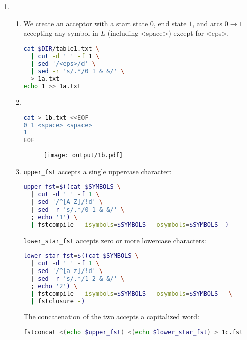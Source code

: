 \documentclass[a4paper,oneside,reqno]{amsart}
\begin{document}
\begin{enumerate}[label=\arabic*.]
  \item
    \begin{enumerate}[label=(\alph*)]
      \item
        We create an acceptor with a start state $0$, end state $1$, and
        arcs $0 \to 1$ accepting any symbol in $L$ (including <space>)
        except for <eps>.
        \begin{lstlisting}[language=bash]
cat $DIR/table1.txt \
  | cut -d ' ' -f 1 \
  | sed '/<eps>/d' \
  | sed -r 's/.*/0 1 & &/' \
  > 1a.txt
echo 1 >> 1a.txt
        \end{lstlisting}

      \item~\\
        \begin{lstlisting}[language=bash]
cat > 1b.txt <<EOF
0 1 <space> <space>
1
EOF
        \end{lstlisting}
        \begin{figure}[ht!]
          \begin{center}
            \texttt{[image: output/1b.pdf]}
          \end{center}
        \end{figure}

      \item \texttt{upper\_fst} accepts a single uppercase character:
        \begin{lstlisting}[language=bash]
upper_fst=$((cat $SYMBOLS \
  | cut -d ' ' -f 1 \
  | sed '/^[A-Z]/!d' \
  | sed -r 's/.*/0 1 & &/' \
  ; echo '1') \
  | fstcompile --isymbols=$SYMBOLS --osymbols=$SYMBOLS -)
        \end{lstlisting}

        \texttt{lower\_star\_fst} accepts zero or more lowercase characters:
        \begin{lstlisting}[language=bash]
lower_star_fst=$((cat $SYMBOLS \
  | cut -d ' ' -f 1 \
  | sed '/^[a-z]/!d' \
  | sed -r 's/.*/1 2 & &/' \
  ; echo '2') \
  | fstcompile --isymbols=$SYMBOLS --osymbols=$SYMBOLS - \
  | fstclosure -)
        \end{lstlisting}

        The concatenation of the two accepts a capitalized word:
        \begin{lstlisting}[language=bash]
fstconcat <(echo $upper_fst) <(echo $lower_star_fst) > 1c.fst
        \end{lstlisting}


\end{enumerate}
\end{enumerate}
\end{document}
